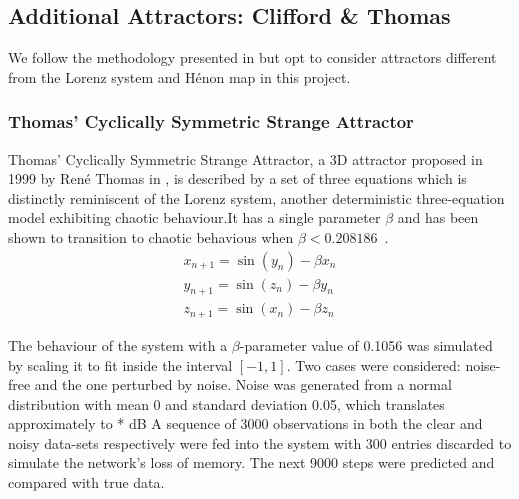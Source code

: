\documentclass[a4paper,12pt,twoside]{report}
\begin{document}
 

\subsection{Additional Attractors: Clifford \& Thomas}
We follow the methodology presented in \cite{manjunath2021universal} but opt to consider attractors different from the Lorenz system and H\'enon map in this project.

\subsubsection{Thomas' Cyclically Symmetric Strange Attractor}\label{Thomas_Attractor}
Thomas' Cyclically Symmetric Strange Attractor, a 3D attractor proposed in 1999 by Ren\'e Thomas in \cite{ThomasAttractor}, is described by a set of three equations which is distinctly reminiscent of the Lorenz system, another deterministic three-equation model exhibiting chaotic behaviour.It has a single parameter $\beta$ and has been shown to transition to chaotic behavious when $\beta<0.208186$~\cite{Thomas_BetaParameter}.
\begin{eqnarray}\label{eqns_thomas}
  x_{n+1} = \sin(y_n) - \beta{x_n} \\
  y_{n+1} = \sin(z_n) - \beta{y_n} \\
  z_{n+1} = \sin(x_n) - \beta{z_n}
\end{eqnarray}

The behaviour of the system with a $\beta$-parameter value of 0.1056 was simulated by scaling it to fit inside the interval $[-1,1]$. Two cases were considered: noise-free and the one perturbed by noise. Noise was generated from a normal distribution with mean 0 and standard deviation 0.05, which translates approximately to * dB 
 A sequence of 3000 observations in both the clear and noisy data-sets respectively were fed into the system with 300 entries discarded to simulate the network's loss of memory. The next 9000 steps were predicted and compared with true data.
\end{document}
